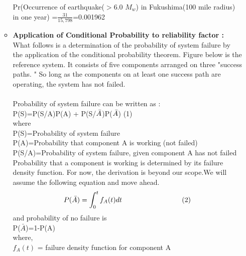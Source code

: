 \documentclass{article}
\begin{document}
\begin{itemize}
\begin{itemize}
Pr(Occurrence of earthquake($>$6.0 $M_{w}$) in Fukushima(100 mile radius) in one year) =$\frac{31}{15,798}$=0.001962  \cite{cite6}
\\

\newpage
\item \textbf{Application of Conditional Probability to reliability factor :}\\
\normalsize
What follows is a determination of the probability of system failure by the application of the conditional probability theorem. Figure below is the reference system. It consists of five components arranged on three "success paths. " So long as the components on at least one success path are operating, the system has not failed.\\ \\
    Probability of system failure can be written as : \\\vspace{3mm}
    \hspace{50mm}P(S)=P(S/A)P(A) + P(S/$\Bar{A}$)P($\Bar{A}$)\cite{cite9}\hspace{30mm} (1)\\
    where\\\vspace{2mm}
    \hspace{15mm}P(S)=Probability of system failure\\\vspace{2mm}
    \hspace{15mm}P(A)=Probability that component A is working (not failed)\\\vspace{2mm}
    \hspace{15mm}P(S/A)=Probability of system failure, given component A has not failed\\\vspace{2mm}
    Probability that a component is working is determined by its failure density function. For now, the derivation is beyond our scope.We will assume the following equation and move ahead. 
    $$P(\Bar{A})=\int_{0}^{t}f_{A}(t)dt \hspace{30mm} (2)$$
    and probability of no failure is \\ \vspace{1mm}
    \hspace{15mm}P($\bar{A}$)=1-P(A) \\
    where,\\ \vspace{1mm}
    \hspace{15mm}$f_{A}(t)$ = failure density function for component A\\

\end{itemize}
\end{itemize}
\end{document}
